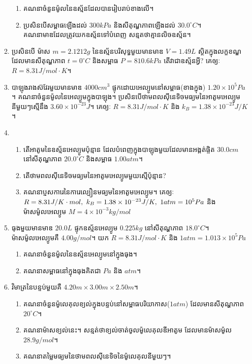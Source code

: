 \begin{enumerate}[m]
\begin{enumerate}[k]
	\item គណនាចំនួនម៉ូលនៃឧស្ម័នដែលបានរៀបរាប់ខាងលើ។
	\item ប្រសិនបើសម្ពាធឡើងដល់ $300kPa$ និងសីតុណ្ហភាពឡើងដល់ $30.0^\circ C$។\\ គណនាមាឌដែលត្រូវយកឧស្ម័នទៅបំពេញ សន្មតថាគ្មានលិចឧស្ម័ន។
\end{enumerate}
\item ប្រសិនបើ ម៉ាស $m=2.1212g$ នៃឧស្ម័នបរិសុទ្ធមួយមានមាឌ $V=1.49L$ ស្ថិតក្នុងលក្ខខណ្ឌដែលមានសីតុណ្ហភាព $t=0^\circ C$ និងសម្ពាធ $P=810.6kPa$ តើវាជាឧស្ម័នអ្វី? គេឲ្យៈ $R=8.31J/mol\cdot K$។
\item បាឡុងរាងស៊វែរមួយមានមាឌ $4000cm^{3}$ ផ្ទុកដោយអេល្យូមនៅសម្ពាធ(ខាងក្នុង) $1.20\times10^{5}Pa$។ គណនាចំនួនម៉ូលនៃអេល្យូមក្នុងបាឡុង។ ប្រសិនបើថាមពលសុីនេទិចមធ្យមនៃអាតូមអេល្យូមនីមួយៗស្មើនឹង $3.60\times10^{-23}J$។ គេឲ្យៈ $R=8.31J/mol\cdot K$ និង $k_{B}=1.38\times10^{-23}J/K$។
\item \begin{enumerate}[k]
	\item តើអាតូមនៃឧស្ម័នអេល្យូមប៉ុន្មាន ដែលបំពេញក្នុងបាឡុងមួយដែលមានអង្គត់ផ្ចិត $30.0cm$ នៅសីតុណ្ហភាព $20.0^\circ C$ និងសម្ពាធ $1.00atm$។
	\item តើថាមពលសុីនេទិចមធ្យមនៃអាតូមអេល្យូមមួយស្មើប៉ុន្មាន?
	\item គណនាប្ញសការេនៃការេល្បឿនមធ្យមនៃអាតូមអេល្យូម។
	គេឲ្យៈ $R=8.31J/K\cdot mol,\\~k_{B}=1.38\times10^{-23}J/K,~1atm=10^{5}Pa$ និងម៉ាសម៉ូលអេល្យូម $M=4\times10^{-3}kg/mol$
\end{enumerate}
\item ធុងមួយមានមាឌ $20.0L$ ផ្ទុកឧស្ម័នអេល្យូម $0.225kg$ នៅសីតុណ្ហភាព $18.0^\circ C$។ ម៉ាសម៉ូលអេល្យូមគឺ $4.00g/mol$។ យក $R=8.31J/mol\cdot K$ និង $1atm=1.013\times10^{5}Pa$
\begin{enumerate}[k]
	\item គណនាចំនួនម៉ូលនៃឧស្ម័នអេល្យូមនៅក្នុងធុង។
	\item គណនាសម្ពាធនៅក្នុងធុងគិតជា $Pa$ និង $atm$។
\end{enumerate}
\item វិមាត្រនៃបន្ទប់មួយគឺ $4.20m\times3.00m\times2.50m$។
\begin{enumerate}[k]
	\item គណនាចំនួនម៉ូលេគុលខ្យល់ក្នុងបន្ទប់នៅសម្ពាធបរិយាកាស​ ($1atm$) ដែលមានសីតុណ្ហភាព $20^\circ C$។
	\item គណនាម៉ាសខ្យល់នេះ។ សន្មត់ថាខ្យល់ចាត់ចូលម៉ូលេគុលឌីអាតូម ដែលមានម៉ាសម៉ូល $28.9g/mol$។
	\item គណនាតម្លៃមធ្យមនៃថាមពលសុីនេទិចនៃម៉ូលេគុលនីមួយៗ។

\end{enumerate}
\end{enumerate}
